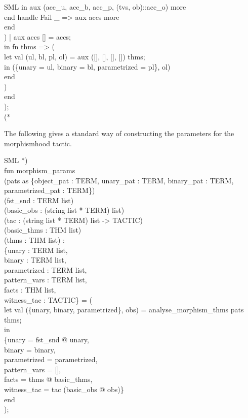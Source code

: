 \documentclass[11pt,a4paper]{article}
\begin{document}
\begin{GFT}{SML}
\+				in	aux (acc\_u, acc\_b, acc\_p, (tvs, ob)::acc\_o) more\\
\+				end	handle Fail \_ => aux accs more\\
\+			end\\
\+		) | aux accs [] = accs;\\
\+	in	fn thms => (\\
\+			let	val (ul, bl, pl, ol) = aux ([], [], [], []) thms;\\
\+			in	(\{unary = ul, binary = bl, parametrized = pl\}, ol)\\
\+			end\\
\+		)\\
\+	end\\
\+);\\
\+(*\\
\end{GFT}
The following gives a standard way of constructing the parameters for the morphismhood tactic.
\begin{GFT}{SML}
\+*)\\
\+fun morphism\_params\PrNN{}\\
\+	(pats as \{object\_pat : TERM, unary\_pat : TERM, binary\_pat : TERM, parametrized\_pat : TERM\})\\
\+	(fst\_snd : TERM list)\\
\+	(basic\_obs : (string list * TERM) list)\\
\+	(tac :  (string list * TERM) list -> TACTIC)\\
\+	(basic\_thms : THM list)\\
\+	(thms : THM list) :\\
\+	\{unary : TERM list,\\
\+	 binary : TERM list,\\
\+	 parametrized : TERM list,\\
\+	 pattern\_vars : TERM list,\\
\+	 facts : THM list,\\
\+	 witness\_tac : TACTIC\} = (\\
\+	let	val (\{unary, binary, parametrized\}, obs) = analyse\_morphism\_thms pats thms;\\
\+	in\\
\+		\{unary = fst\_snd @ unary,\\
\+		 binary = binary,\\
\+		 parametrized = parametrized,\\
\+		 pattern\_vars = [],\\
\+		 facts = thms @ basic\_thms,\\
\+		 witness\_tac = tac (basic\_obs @ obs)\}\\
\+	end\\
\+);\\
\+\\
\end{GFT}
\end{document}
